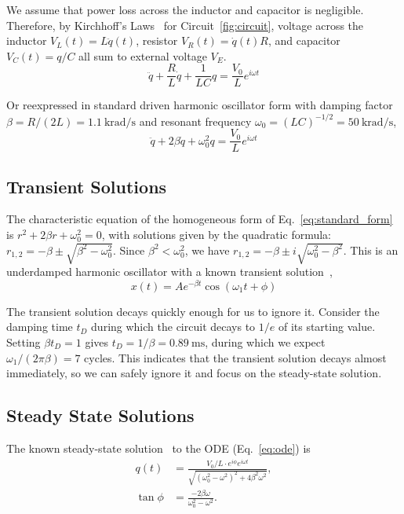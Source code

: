 \documentclass[11pt,twocolumn]{article}
\begin{document}
We assume that power loss across the inductor and capacitor is negligible. Therefore, by Kirchhoff's Laws~\cite{gingrich} for Circuit~\ref{fig:circuit}, voltage across the inductor $V_L(t) = L \ddot{q}(t)$, resistor $V_R(t) = \dot{q}(t) R$, and capacitor $V_C(t) = q/C$ all sum to external voltage $V_E$.
\begin{equation}
  \label{eq:ode}
  \ddot{q} + \frac{R}{L} \dot{q} + \frac{1}{LC} q = \frac{V_0}{L} e^{i\omega t}
\end{equation}

Or reexpressed in standard driven harmonic oscillator form with damping factor $\beta = R/(2L) = \qty{1.1}{\kilo\radian\per\second}$ and resonant frequency $\omega_0 = (LC)^{-1/2} = \qty{50}{\kilo\radian\per\second}$,
\begin{equation}
  \label{eq:standard_form}
  \ddot{q} + 2\beta \dot{q} + \omega_0^2 q = \frac{V_0}{L} e^{i\omega t}
\end{equation}

\subsection{Transient Solutions}\label{sec:transient}
The characteristic equation of the homogeneous form of Eq.~\eqref{eq:standard_form} is $r^2 + 2\beta r + \omega_0^2 = 0$, with solutions given by the quadratic formula: $r_{1,2} = -\beta \pm \sqrt{\beta^2 - \omega_0^2}$. Since $\beta^2 < \omega_0^2$, we have $r_{1,2} = -\beta \pm i\sqrt{\omega_0^2 - \beta^2}$. This is an underdamped harmonic oscillator with a known transient solution~\cite{gingrich},
\begin{equation}
  \label{eq:transient}
  x(t) = A e^{-\beta t} \cos(\omega_1 t + \phi)
\end{equation}

The transient solution decays quickly enough for us to ignore it. Consider the damping time $t_D$ during which the circuit decays to $1/e$ of its starting value. Setting $\beta t_D = 1$ gives $t_D = 1/\beta = \qty{0.89}{\milli\s}$, during which we expect $\omega_1/(2\pi\beta) = 7$ cycles. This indicates that the transient solution decays almost immediately, so we can safely ignore it and focus on the steady-state solution.

\subsection{Steady State Solutions}\label{sec:steady}
The known steady-state solution~\cite{gingrich} to the ODE (Eq.~\eqref{eq:ode}) is
\begin{equation}
  \label{eq:amp_phase}
  \begin{aligned}
    q(t)     & = \frac{V_0/L \cdot e^{i\phi} e^{i\omega t}}{\sqrt{(\omega_0^2 - \omega^2)^2 + 4\beta^2\omega^2}}, \\
    \tan\phi & = \frac{-2\beta\omega}{\omega_0^2 - \omega^2}.
  \end{aligned}
\end{equation}
\end{document}
